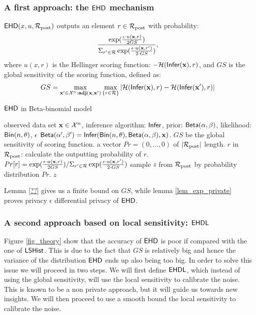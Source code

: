 \documentclass{article}
\begin{document}
\subsubsection{A first approach: the $\mathsf{EHD}$ mechanism}
\label{sec_ehd}
$\mathsf{EHD}(x,u,\mathcal{R}_{\textup{post}})$  outputs an element $r\in\mathcal{R}_{\textup{post}}$ with  probability: %
\[
\frac
  {\exp(\frac{\epsilon\cdot u(\textbf{x}, {r})}{2 GS})}
{\Sigma_{r' \in \mathcal{R}}\exp(\frac{\epsilon\cdot u(\textbf{x}, {r'})}{2\cdot GS})},
\]
where $u(x,r)$ is the Hellinger scoring function: $-\mathcal{H}(\mathsf{Infer}(\textbf{x}), r)$, and $GS$ is the global sensitivity of the scoring function, defined as:
\begin{equation*}
GS = 
\max_{\textbf{x}' \in \mathcal{X}^n: \\ \textbf{adj}(\textbf{x},\textbf{x}')}\max_{\{r\in \mathcal{R}\}}
|\mathcal{H}(\mathsf{Infer}(\textbf{x}), r) - \mathcal{H}(\mathsf{Infer}(\textbf{x}'), r)|
\end{equation*}
%
  \begin{algorithm}
  \caption{$\mathsf{EHD}$ in Beta-binomial model}
  \label{mech:expmech}
  \begin{algorithmic}
  \INPUT observed data set $\textbf{x} \in \mathcal{X}^n$, inference algorithm: $\mathsf{Infer}$, 
  prior: $\mathsf{Beta}(\alpha, \beta)$, likelihood: $\mathsf{Bin}(n, \theta)$, $\epsilon$
  \STATE {} $\mathsf{Beta}(\alpha', \beta') = \mathsf{Infer}(\mathsf{Bin}(n, \theta), \mathsf{Beta}(\alpha, \beta), \textbf{x})$. $GS$ be the global sensitivity of scoring function.  
  \STATE {} a vector $Pr = (0, \dots, 0 )$ of $|\mathcal{R}_{\textup{post}}|$ length.
  \STATE {} $r$ in $\mathcal{R}_{\textup{post}}$:
  \STATE \quad \quad calculate the outputting probability of $r$.
  \STATE \quad \quad $Pr[r] = 
  {\exp(\frac{\epsilon\cdot u(\textbf{x}, {r})}{2 GS})}
/ {\Sigma_{r' \in \mathcal{R}}\exp(\frac{\epsilon\cdot u(\textbf{x}, r')}{2\cdot GS})}$
\STATE \quad sample $z$ from $\mathcal{R}_{\textup{post}}$ by probability distribution $Pr$.
   $z$
  \end{algorithmic}
  \end{algorithm}

Lemma \ref{??} gives us a finite bound on $GS$, while lemma \ref{lem_exp_private} proves privacy $\epsilon$ differential privacy of $\mathsf{EHD}$.


\subsubsection{A second approach based on local sensitivity: $\mathsf{EHDL}$}
\label{sec_ehdl}
Figure \ref{fig_theory} show that  the accuracy of $\mathsf{EHD}$ is poor if compared with the one of $\mathsf{LSHist}$. This is due to the fact that
$GS$ is relatively big and hence the variance of the distribution $\mathsf{EHD}$ ends up also being too big. In order to solve this issue we
will proceed in two steps. We will first define $\mathsf{EHDL}$, which instead of using the global sensitivity, will use the local sensitivity to calibrate
the noise. This is known to be a non private approach, but it will guide us towards new insights.
We will then proceed to use a smooth bound the local sensitivity to
calibrate the noise.
\end{document}
